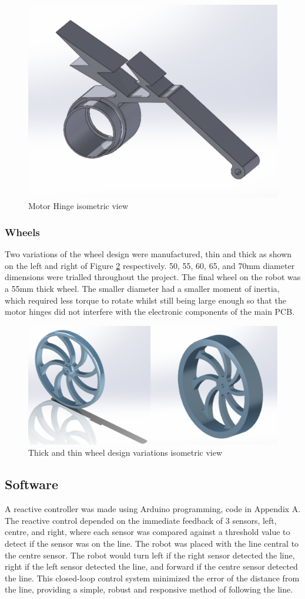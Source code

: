 \begin{figure}[H]
    \centering
    \includegraphics[width=0.3\linewidth]{REPORT/MotorHinge.png}
    \caption{Motor Hinge isometric view}
    \label{fig:Motorhinge}
\end{figure}

\subsubsection{Wheels}
Two variations of the wheel design were manufactured, thin and thick as shown on the left and right of Figure \ref{fig:Wheels} respectively. 50, 55, 60, 65, and 70mm diameter dimensions were trialled throughout the project. The final wheel on the robot was a 55mm thick wheel. The smaller diameter had a smaller moment of inertia, which required less torque to rotate whilst still being large enough so that the motor hinges did not interfere with the electronic components of the main PCB. 

\begin{figure}[H]
    \centering
    \includegraphics[width=0.5\linewidth]{REPORT/Wheels.png}
    \caption{Thick and thin wheel design variations isometric view}
    \label{fig:Wheels}
\end{figure}

\subsection{Software}
A reactive controller was made using Arduino programming, code in Appendix A. The reactive control depended on the immediate feedback of 3 sensors, left, centre, and right, where each sensor was compared against a threshold value to detect if the sensor was on the line. The robot was placed with the line central to the centre sensor. The robot would turn left if the right sensor detected the line, right if the left sensor detected the line, and forward if the centre sensor detected the line. This closed-loop control system minimized the error of the distance from the line, providing a simple, robust and responsive method of following the line.  
